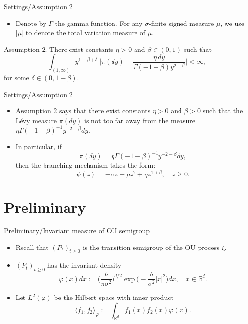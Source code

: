 \documentclass[xcolor=dvipsnames]{beamer}
\begin{document}
\begin{frame}{Settings/Assumption 2}
\begin{itemize}
\item
	Denote by $\Gamma$ the gamma function.
	For any $\sigma$-finite signed measure $\mu$, we use $|\mu|$ to denote the total variation measure of $\mu$.
\end{itemize}
\begin{block}{Assumption 2.}
	There exist constants $\eta > 0$ and $\beta \in (0,1)$ such that
\begin{equation}
    \int_{(1,\infty)}y^{1+\beta +\delta}~\Big|\pi(dy)-\frac{\eta~dy}{\Gamma(-1-\beta)y^{2+\beta}}\Big| <\infty,
\end{equation}
	for some $\delta \in (0,1-\beta)$.
\end{block}
\end{frame}

\begin{frame}{Settings/Assumption 2}
\begin{itemize}
\item
	Assumption 2 says that 
 there exist constants $\eta>0$ and $\beta > 0$ 
    such that the L\'evy measure $\pi(dy)$ is not too far away from the measure $\eta \Gamma(-1-\beta)^{-1}y^{-2-\beta} dy$.
\item
    In particular, if \[\pi(dy)=\eta \Gamma(-1-\beta)^{-1}y^{-2-\beta} dy,\] then the branching mechanism takes the form: \[\psi(z)=-\alpha z + \rho z^2 + \eta z^{1+\beta},\quad z\geq 0.\]
\end{itemize}
\end{frame}

\section{Preliminary}
\begin{frame}{Preliminary/Invariant measure of OU semigroup}
\begin{itemize}
\item
  Recall that $(P_t)_{t\geq 0}$ is the transition semigroup of the OU process $\xi$.
\item
  $(P_t)_{t\geq 0}$ has the invariant density
\begin{equation}
    \varphi(x)dx
    :=\Big (\frac{b}{\pi \sigma^2}\Big )^{d/2}\exp \Big(-\frac{b}{\sigma^2}|x|^2 \Big)dx,
    \quad x\in \mathbb R^d.
\end{equation}
\item
    Let $L^2(\varphi)$ be the Hilbert space with inner product
\begin{equation}
    \langle f_1, f_2 \rangle_{\varphi}
    := \int_{\mathbb R^d}f_1(x)f_2(x)\varphi(x).
\end{equation}
\end{itemize}
\end{frame}
\end{document}
